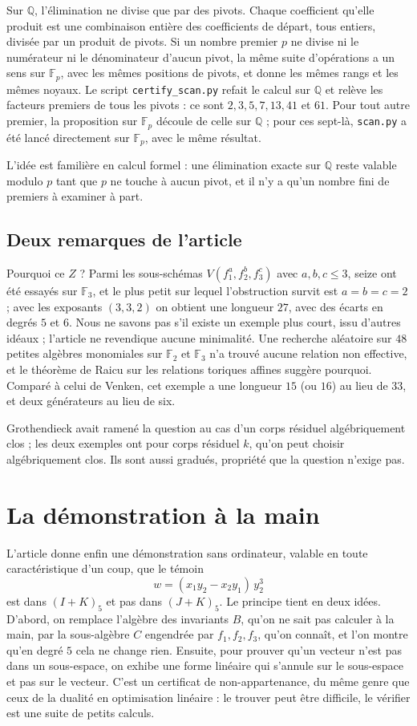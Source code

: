 \documentclass[11pt,a4paper]{amsart}
\theoremstyle{definition}
\theoremstyle{plain}
\theoremstyle{remark}
\newcommand{\F}{\mathbb F}
\newcommand{\Q}{\mathbb Q}
\begin{document}
Sur $\Q$, l'élimination ne divise que par des pivots. Chaque coefficient qu'elle produit est une combinaison entière des coefficients de départ, tous entiers, divisée par un produit de pivots. Si un nombre premier $p$ ne divise ni le numérateur ni le dénominateur d'aucun pivot, la même suite d'opérations a un sens sur $\F_p$, avec les mêmes positions de pivots, et donne les mêmes rangs et les mêmes noyaux. Le script \texttt{certify\_scan.py} refait le calcul sur $\Q$ et relève les facteurs premiers de tous les pivots : ce sont $2, 3, 5, 7, 13, 41$ et $61$. Pour tout autre premier, la proposition sur $\F_p$ découle de celle sur $\Q$ ; pour ces sept-là, \texttt{scan.py} a été lancé directement sur $\F_p$, avec le même résultat.

L'idée est familière en calcul formel : une élimination exacte sur $\Q$ reste valable modulo $p$ tant que $p$ ne touche à aucun pivot, et il n'y a qu'un nombre fini de premiers à examiner à part.

\subsection{Deux remarques de l'article}

Pourquoi ce $Z$ ? Parmi les sous-schémas $V(f_1^a, f_2^b, f_3^c)$ avec $a, b, c \le 3$, seize ont été essayés sur $\F_3$, et le plus petit sur lequel l'obstruction survit est $a = b = c = 2$ ; avec les exposants $(3, 3, 2)$ on obtient une longueur $27$, avec des écarts en degrés $5$ et $6$. Nous ne savons pas s'il existe un exemple plus court, issu d'autres idéaux ; l'article ne revendique aucune minimalité. Une recherche aléatoire sur $48$ petites algèbres monomiales sur $\F_2$ et $\F_3$ n'a trouvé aucune relation non effective, et le théorème de Raicu sur les relations toriques affines suggère pourquoi. Comparé à celui de Venken, cet exemple a une longueur $15$ (ou $16$) au lieu de $33$, et deux générateurs au lieu de six.

Grothendieck avait ramené la question au cas d'un corps résiduel algébriquement clos ; les deux exemples ont pour corps résiduel $k$, qu'on peut choisir algébriquement clos. Ils sont aussi gradués, propriété que la question n'exige pas.

\section{La démonstration à la main}\label{sec:main}

L'article donne enfin une démonstration sans ordinateur, valable en toute caractéristique d'un coup, que le témoin
\[
w = (x_1y_2 - x_2y_1)\,y_2^3
\]
est dans $(I + K)_5$ et pas dans $(J + K)_5$. Le principe tient en deux idées. D'abord, on remplace l'algèbre des invariants $B$, qu'on ne sait pas calculer à la main, par la sous-algèbre $C$ engendrée par $f_1, f_2, f_3$, qu'on connaît, et l'on montre qu'en degré $5$ cela ne change rien. Ensuite, pour prouver qu'un vecteur n'est pas dans un sous-espace, on exhibe une forme linéaire qui s'annule sur le sous-espace et pas sur le vecteur. C'est un certificat de non-appartenance, du même genre que ceux de la dualité en optimisation linéaire : le trouver peut être difficile, le vérifier est une suite de petits calculs.
\end{document}
